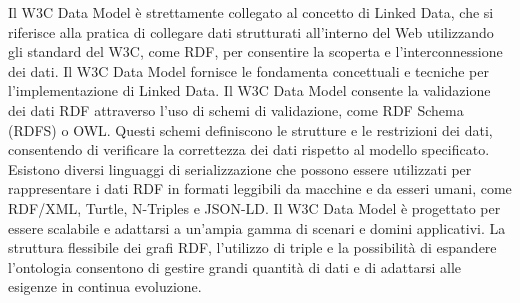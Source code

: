 Il W3C Data Model è strettamente collegato al concetto di Linked Data, che si riferisce alla pratica di collegare dati strutturati all'interno del Web utilizzando gli standard del W3C, come RDF, per consentire la scoperta e l'interconnessione dei dati. Il W3C Data Model fornisce le fondamenta concettuali e tecniche per l'implementazione di Linked Data.
Il W3C Data Model consente la validazione dei dati RDF attraverso l'uso di schemi di validazione, come RDF Schema (RDFS) o OWL. Questi schemi definiscono le strutture e le restrizioni dei dati, consentendo di verificare la correttezza dei dati rispetto al modello specificato.\\
Esistono diversi linguaggi di serializzazione che possono essere utilizzati per rappresentare i dati RDF in formati leggibili da macchine e da esseri umani, come RDF/XML, Turtle, N-Triples e JSON-LD.
Il W3C Data Model è progettato per essere scalabile e adattarsi a un'ampia gamma di scenari e domini applicativi. La struttura flessibile dei grafi RDF, l'utilizzo di triple e la possibilità di espandere l'ontologia consentono di gestire grandi quantità di dati e di adattarsi alle esigenze in continua evoluzione.\\

